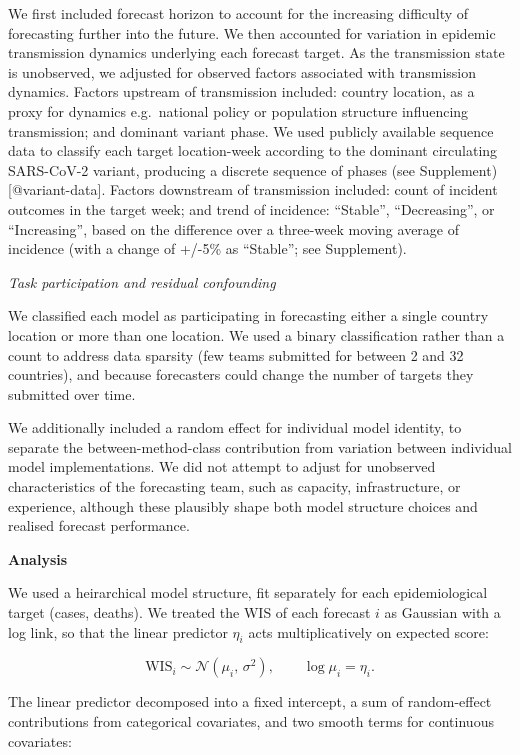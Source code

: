 \documentclass[
  letterpaper,
  DIV=11,
  numbers=noendperiod]{scrartcl}
\begin{document}
We first included forecast horizon to account for the increasing
difficulty of forecasting further into the future. We then accounted for
variation in epidemic transmission dynamics underlying each forecast
target. As the transmission state is unobserved, we adjusted for
observed factors associated with transmission dynamics. Factors upstream
of transmission included: country location, as a proxy for dynamics
e.g.~national policy or population structure influencing transmission;
and dominant variant phase. We used publicly available sequence data to
classify each target location-week according to the dominant circulating
SARS-CoV-2 variant, producing a discrete sequence of phases (see
Supplement) {[}@variant-data{]}. Factors downstream of transmission
included: count of incident outcomes in the target week; and trend of
incidence: ``Stable'', ``Decreasing'', or ``Increasing'', based on the
difference over a three-week moving average of incidence (with a change
of +/-5\% as ``Stable''; see Supplement).

\emph{Task participation and residual confounding}

We classified each model as participating in forecasting either a single
country location or more than one location. We used a binary
classification rather than a count to address data sparsity (few teams
submitted for between 2 and 32 countries), and because forecasters could
change the number of targets they submitted over time.

We additionally included a random effect for individual model identity,
to separate the between-method-class contribution from variation between
individual model implementations. We did not attempt to adjust for
unobserved characteristics of the forecasting team, such as capacity,
infrastructure, or experience, although these plausibly shape both model
structure choices and realised forecast performance.

\textbf{Analysis}

We used a heirarchical model structure, fit separately for each
epidemiological target (cases, deaths). We treated the WIS of each
forecast \(i\) as Gaussian with a log link, so that the linear predictor
\(\eta_i\) acts multiplicatively on expected score:

\[
\mathrm{WIS}_i \sim \mathcal{N}(\mu_i,\, \sigma^2), \qquad \log \mu_i = \eta_i.
\]

The linear predictor decomposed into a fixed intercept, a sum of
random-effect contributions from categorical covariates, and two smooth
terms for continuous covariates:
\end{document}
